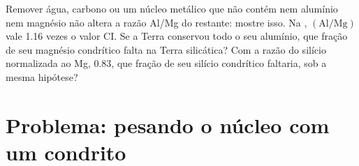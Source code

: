 \begin{exercise}[$\star\star\star$]\label{exo:b2:elements-in-the-earth:12}
Remover água, carbono ou um núcleo metálico que não contém nem alumínio nem
magnésio não altera a razão Al/Mg do restante: mostre isso. Na , $(\mathrm{Al}/\mathrm{Mg})$ vale 1.16 vezes o valor CI. Se a
Terra conservou todo o seu alumínio, que fração de seu magnésio condrítico
falta na Terra silicática? Com a razão do silício normalizada ao Mg,
0.83, que fração de seu silício condrítico faltaria, sob a mesma
hipótese?
\end{exercise}

\section{Problema: pesando o núcleo com um condrito}


